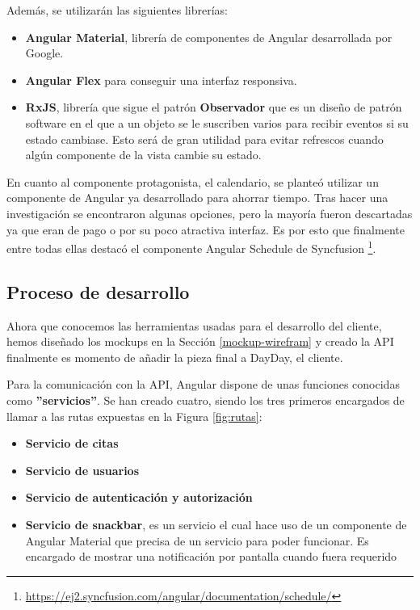 Además, se utilizarán las siguientes librerías:
\begin{itemize}
    \item \textbf{Angular Material}, librería de componentes de Angular desarrollada por Google.
    \item \textbf{Angular Flex} para conseguir una interfaz responsiva.
    \item \textbf{RxJS}, librería que sigue el patrón \textbf{Observador} que es un diseño de patrón software en el que a un objeto se le suscriben varios para recibir eventos si su estado cambiase. Esto será de gran utilidad para evitar refrescos cuando algún componente de la vista cambie su estado.
\end{itemize}

En cuanto al componente protagonista, el calendario, se planteó utilizar un componente de Angular ya desarrollado para ahorrar tiempo. Tras hacer una investigación se encontraron algunas opciones, pero la mayoría fueron descartadas ya que eran de pago o por su poco atractiva interfaz. Es por esto que finalmente entre todas ellas destacó el componente Angular Schedule de Syncfusion \footnote{\url{https://ej2.syncfusion.com/angular/documentation/schedule/}}.

\subsection{Proceso de desarrollo}
Ahora que conocemos las herramientas usadas para el desarrollo del cliente, hemos diseñado los mockups en la Sección \ref{mockup-wirefram} y creado la API finalmente es momento de añadir la pieza final a DayDay, el cliente. \bigskip

Para la comunicación con la API, Angular dispone de unas funciones conocidas como \textbf{''servicios''}. Se han creado cuatro, siendo los tres primeros encargados de llamar a las rutas expuestas en la Figura \ref{fig:rutas}:

\begin{itemize}
    \item \textbf{Servicio de citas}
    \item \textbf{Servicio de usuarios}
    \item \textbf{Servicio de autenticación y autorización}
    \item \textbf{Servicio de snackbar}, es un servicio el cual hace uso de un componente de Angular Material que precisa de un servicio para poder funcionar. Es encargado de mostrar una notificación por pantalla cuando fuera requerido
\end{itemize}

